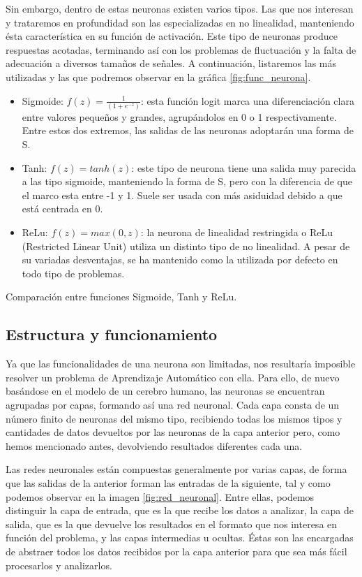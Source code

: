 Sin embargo, dentro de estas neuronas existen varios tipos. Las que nos interesan y trataremos en profundidad son las especializadas en no linealidad, manteniendo ésta característica en su función de activación. Este tipo de neuronas produce respuestas acotadas, terminando así con los problemas de fluctuación y la falta de adecuación a diversos tamaños de señales. A continuación, listaremos las más utilizadas y las que podremos observar en la gráfica \ref{fig:func_neurona}.

\begin{itemize}
    \item Sigmoide: $f(z) = \frac{1}{(1+e^{-z})}$: esta función logit marca una diferenciación clara entre valores pequeños y grandes, agrupándolos en 0 o 1 respectivamente. Entre estos dos extremos, las salidas de las neuronas adoptarán una forma de S.
    \item Tanh: $f(z)= tanh(z)$: este tipo de neurona tiene una salida muy parecida a las tipo sigmoide, manteniendo la forma de S, pero con la diferencia de que el marco esta entre -1 y 1. Suele ser usada con más asiduidad debido a que está centrada en 0.
    \item ReLu: $f(z) = max(0,z)$: la neurona de linealidad restringida o ReLu (Restricted Linear Unit) utiliza un distinto tipo de no linealidad. A pesar de su variadas desventajas, se ha mantenido como la utilizada por defecto en todo tipo de problemas.
\end{itemize}

%
       {Comparación entre funciones Sigmoide, Tanh y ReLu.}

\subsection{Estructura y funcionamiento}
Ya que las funcionalidades de una neurona son limitadas, nos resultaría imposible resolver un problema de Aprendizaje Automático con ella. Para ello, de nuevo basándose en el modelo de un cerebro humano, las neuronas se encuentran agrupadas por capas, formando así una red neuronal. Cada capa consta de un número finito de neuronas del mismo tipo, recibiendo todas los mismos tipos y cantidades de datos devueltos por las neuronas de la capa anterior pero, como hemos mencionado antes, devolviendo resultados diferentes cada una.

Las redes neuronales están compuestas generalmente por varias capas, de forma que las salidas de la anterior forman las entradas de la siguiente, tal y como podemos observar en la imagen \ref{fig:red_neuronal}. Entre ellas, podemos distinguir la capa de entrada, que es la que recibe los datos a analizar, la capa de salida, que es la que devuelve los resultados en el formato que nos interesa en función del problema, y las capas intermedias u ocultas. Éstas son las encargadas de abstraer todos los datos recibidos por la capa anterior para que sea más fácil procesarlos y analizarlos. 

